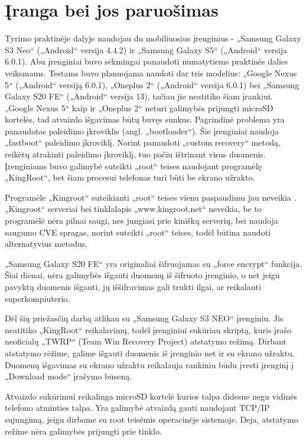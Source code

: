 \documentclass[a4paper,12pt,fleqn]{article}
\begin{document}
\section{Įranga bei jos paruošimas}

Tyrimo praktinėje dalyje naudojau du mobiliuosius įrenginius - „Samsung Galaxy S3 Neo“ („Android“ versija 4.4.2) ir „Samsung Galaxy S5“ („Android“ versija 6.0.1). Abu įrenginiai buvo sėkmingai panaudoti numatytiems praktinės dalies veiksmams. Testams buvo planuojama naudoti dar tris modelius: „Google Nexus 5“ („Android“ versiją 6.0.1), „Oneplus 2“ („Android“ versija 6.0.1) bei „Samsung Galaxy S20 FE“ („Android“ versija 13), tačiau jie neatitiko šiam įrankiui. „Google Nexus 5“ kaip ir „Oneplus 2“ neturi galimybės prijungti microSD kortelės, tad atvaizdo išgavimas būtų buvęs sunkus. Pagrindinė problema yra panaudotas paleidimo įkroviklis (angl. „bootloader“). Šie įrenginiai naudoja „fastboot“ paleidimo įkroviklį. Norint panaudoti „custom recovery“ metodą, reikėtų atrakinti paleidimo įkroviklį, tuo pačiu ištrinant visus duomenis. Įrenginiams buvo galimybė suteikti „root“ teises naudojant programėlę „KingRoot“, bet šiam procesui telefonas turi būti be ekrano užrakto. 

Programėle „Kingroot“ suteikianti „root“ teises vienu paspaudimu jau neveikia \cite{KingrootNoLongerWorks} . „Kingroot“ serveriai bei tinklalapis „www.kingroot.net“ neveikia, be to programėlė nėra pilnai saugi, nes jungiasi prie kiniškų serverių\cite{XDAKingroot}, bei naudoja saugumo CVE spragas, norint suteikti „root“ teises, todėl būtina naudoti alternatyvius metodus. \cite{kingroot}

„Samsung Galaxy S20 FE“ yra originaliai šifruojamas su „force encrypt“ funkcija. Šiai dienai, nėra galimybės išgauti duomenų iš šifruoto įrenginio, o net jeigu pavyktų duomenis išgauti, jų iššifravimas gali trukti ilgai, ar reikalauti superkompiuterio.

Dėl šių priežasčių darbą atlikau su „Samsung Galaxy S3 NEO“ įrenginiu. Jis neatitiko „KingRoot“ reikalavimų, todėl įrenginiui sukūriau skriptą, kuris įrašo neoficialų „TWRP“ (Team Win Recovery Project)  \cite{twrp} atstatymo režimą. Dirbant atstatymo rėžime, galime išgauti duomenis iš įrenginio net ir su ekrano užraktu. Duomenų išgavimas su ekrano užraktu reikalauja rankiniu būdu įvesti įrenginį į „Download mode“ įrašymo būseną.

Atvaizdo sukūrimui reikalinga microSD kortelė kurios talpa didesne negu vidinės telefono atminties talpa. Yra galimybė atvaizdą gauti naudojant TCP/IP sujungimą, jeigu dirbame su root teisėmis operacinėje sistemoje. Deja, atstatymo režime nėra galimybės prijungti prie tinklo.
\end{document}
